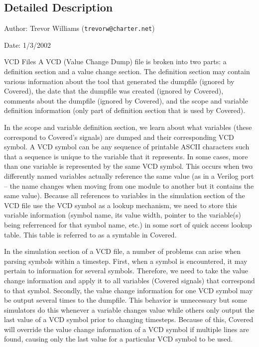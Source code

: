 \subsection{Detailed Description}
\begin{Desc}
\item[Author:]Trevor Williams ({\tt trevorw@charter.net}) \end{Desc}
\begin{Desc}
\item[Date:]1/3/2002\end{Desc}
\begin{Desc}
\item[VCD Files]A VCD (Value Change Dump) file is broken into two parts: a definition section and a value change section. The definition section may contain various information about the tool that generated the dumpfile (ignored by Covered), the date that the dumpfile was created (ignored by Covered), comments about the dumpfile (ignored by Covered), and the scope and variable definition information (only part of definition section that is used by Covered).\end{Desc}
\begin{Desc}
\item[]In the scope and variable definition section, we learn about what variables (these correspond to Covered's signals) are dumped and their corresponding VCD symbol. A VCD symbol can be any sequence of printable ASCII characters such that a sequence is unique to the variable that it represents. In some cases, more than one variable is represented by the same VCD symbol. This occurs when two differently named variables actually reference the same value (as in a Verilog port -- the name changes when moving from one module to another but it contains the same value). Because all references to variables in the simulation section of the VCD file use the VCD symbol as a lookup mechanism, we need to store this variable information (symbol name, its value width, pointer to the variable(s) being referrenced for that symbol name, etc.) in some sort of quick access lookup table. This table is referred to as a symtable in Covered.\end{Desc}
\begin{Desc}
\item[]In the simulation section of a VCD file, a number of problems can arise when parsing symbols within a timestep. First, when a symbol is encountered, it may pertain to information for several symbols. Therefore, we need to take the value change information and apply it to all variables (Covered signals) that correspond to that symbol. Secondly, the value change information for one VCD symbol may be output several times to the dumpfile. This behavior is unnecessary but some simulators do this whenever a variable changes value while others only output the last value of a VCD symbol prior to changing timesteps. Because of this, Covered will override the value change information of a VCD symbol if multiple lines are found, causing only the last value for a particular VCD symbol to be used.\end{Desc}
